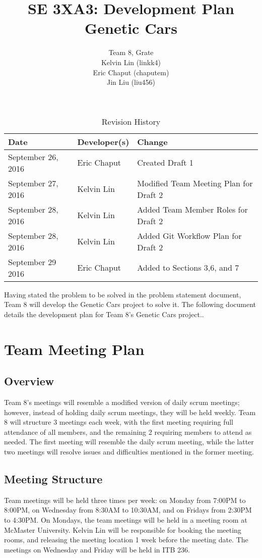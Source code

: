 \documentclass{article}
\title{SE 3XA3: Development Plan\\Genetic Cars}
\author{Team 8, Grate
		\\ Kelvin Lin (linkk4)
		\\ Eric Chaput (chaputem)
		\\ Jin Liu (liu456)
}
\date{}
\begin{document}
\begin{table}[hp]
\caption{Revision History} \label{TblRevisionHistory}
\begin{tabularx}{\textwidth}{llX}
\toprule
\textbf{Date} & \textbf{Developer(s)} & \textbf{Change}\\
\midrule
September 26, 2016 & Eric Chaput & Created Draft 1\\
September 27, 2016 & Kelvin Lin & Modified Team Meeting Plan for Draft 2\\
September 28, 2016 & Kelvin Lin & Added Team Member Roles for Draft 2\\
September 28, 2016 & Kelvin Lin & Added Git Workflow Plan for Draft 2\\
September 29 2016 & Eric Chaput & Added to Sections 3,6, and 7\\
\bottomrule
\end{tabularx}
\end{table}

\newpage

\maketitle


Having stated the problem to be solved in the problem statement document, Team 8 will develop the Genetic Cars project to solve it. The following document details the development plan for Team 8's Genetic Cars project..

\section{Team Meeting Plan}

\subsection{Overview}
Team 8's meetings will resemble a modified version of daily scrum meetings; 
however, instead of holding daily scrum meetings, they will be held weekly. Team 
8 will structure 3 meetings each week, with the first meeting requiring full 
attendance of all members, and the remaining 2 requiring members to attend as 
needed. The first meeting will resemble the daily scrum meeting, while the 
latter two meetings will resolve issues and difficulties mentioned in the former 
meeting.

\subsection{Meeting Structure}
Team meetings will be held three times per week: on Monday from 7:00PM to 
8:00PM, on Wednesday from 8:30AM to 10:30AM, and on Fridays from 2:30PM to 
4:30PM. On Mondays, the team meetings will be held in a meeting room at McMaster 
University. Kelvin Lin will be responsible for booking the meeting rooms, and 
releasing the meeting location 1 week before the meeting date. The meetings on 
Wednesday and Friday will be held in ITB 236.
\end{document}
